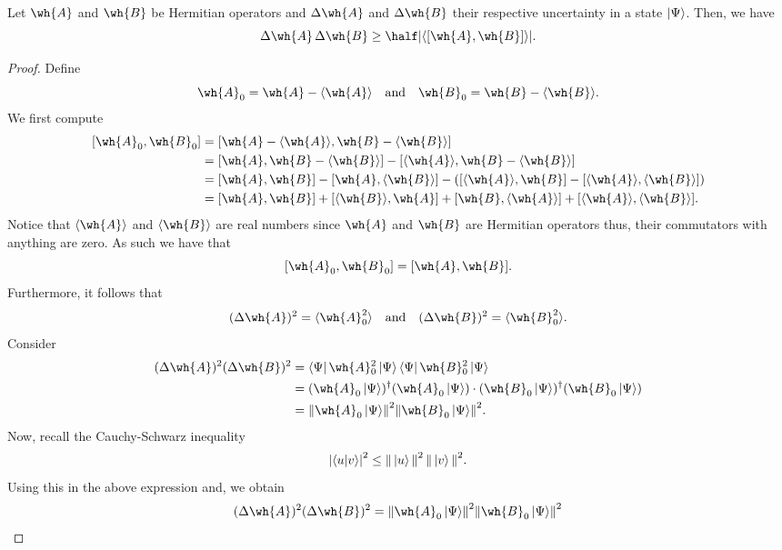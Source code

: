 \documentclass[12pt, a4paper]{article}
\begin{document}
\begin{mdthm}
    Let \(\wh{A}\) and \(\wh{B}\) be Hermitian operators and \(\Delta \wh{A}\) and \(\Delta \wh{B}\) their respective uncertainty in a state \(\ket{\Psi}\). Then, we have
    \[\Delta \wh{A} \, \Delta \wh{B} \geq \half \abs{ \left\langle \left[\wh{A},\wh{B}\right] \right\rangle }.\]
\end{mdthm}

\begin{proof}
    Define 
    \[\wh{A}_0 = \wh{A}-\langle \wh{A} \rangle \quad \text{and}\quad \wh{B}_0 = \wh{B}-\langle \wh{B} \rangle.\] 
    We first compute 
    \[\begin{aligned}
        [\wh{A}_0,\wh{B}_0] &= [\wh{A}-\langle \wh{A}\rangle,\wh{B}-\langle \wh{B}\rangle] \\
        &= [\wh{A},\wh{B}-\langle \wh{B}\rangle]-[\langle \wh{A} \rangle, \wh{B}-\langle \wh{B}\rangle] \\
        &= [\wh{A},\wh{B}]-[\wh{A},\langle \wh{B}\rangle]- \left( [\langle \wh{A}\rangle,\wh{B}]-[\langle \wh{A}\rangle,\langle \wh{B}\rangle] \right) \\
        &= [\wh{A},\wh{B}]+[\langle \wh{B}\rangle,\wh{A}]+[\wh{B},\langle \wh{A}\rangle] + [\langle \wh{A}\rangle,\langle \wh{B}\rangle].
    \end{aligned}\]
    Notice that \(\langle \wh{A}\rangle\) and \(\langle \wh{B}\rangle\) are real numbers since \(\wh{A}\) and \(\wh{B}\) are Hermitian operators thus, their commutators with anything are zero. As such we have that 
    \[[\wh{A}_0,\wh{B}_0]=[\wh{A},\wh{B}].\]
    Furthermore, it follows that
    \[(\Delta \wh{A})^2 = \langle \wh{A}_0^2 \rangle \quad \text{and} \quad (\Delta \wh{B})^2 = \langle \wh{B}_0^2 \rangle.\]
    Consider
    \[\begin{aligned}
        (\Delta \wh{A})^2 (\Delta \wh{B})^2 &= \bra{\Psi} \wh{A}_0^2 \ket{\Psi} \bra{\Psi} \wh{B}_0^2 \ket{\Psi} \\
        &= (\wh{A}_0 \ket{\Psi})^{\dagger} (\wh{A}_0 \ket{\Psi}) \cdot (\wh{B}_0 \ket{\Psi})^{\dagger}(\wh{B}_0 \ket{\Psi}) \\
        &= \norm{\wh{A}_0 \ket{\Psi}}^2 \norm{\wh{B}_0 \ket{\Psi}}^2.
    \end{aligned}\]
    Now, recall the Cauchy-Schwarz inequality 
    \[\abs{\bra{u} \ket{v}}^2 \leq \norm{\, \ket{u} \,}^2 \, \norm{\, \ket{v} \,}^2.\]
    Using this in the above expression and, we obtain 
    \[\begin{aligned}
        (\Delta \wh{A})^2 (\Delta \wh{B})^2 &=\norm{\wh{A}_0 \ket{\Psi}}^2 \norm{\wh{B}_0 \ket{\Psi}}^2 \\

\end{aligned}\]
\end{proof}
\end{document}
